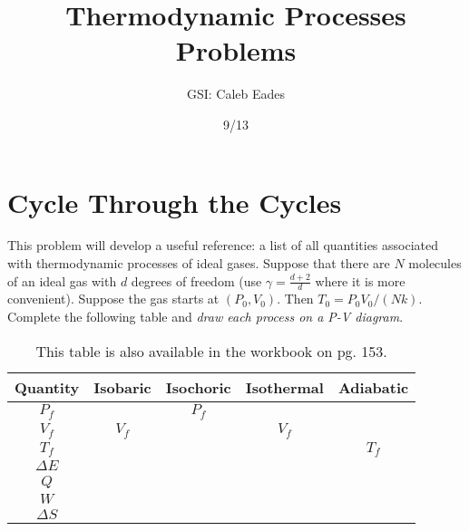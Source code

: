 \documentclass{article}
\begin{document}
\title{Thermodynamic Processes Problems}
\author{GSI: Caleb Eades}
\date{9/13}
\maketitle

\section{Cycle Through the Cycles}

This problem will develop a useful reference: a list of all quantities associated with thermodynamic processes of ideal gases. Suppose that there are $N$ molecules of an ideal gas with $d$ degrees of freedom (use $\gamma = \frac{d+2}{d}$ where it is more convenient). Suppose the gas starts at $(P_0,V_0)$. Then $T_0 = P_0V_0/(Nk)$. Complete the following table and \textit{draw each process on a P-V diagram}.

\def\arraystretch{2.5}
\begin{table}[h]
	\begin{center}
	\caption{This table is also available in the workbook on pg. 153.}
	
	\begin{tabular}{| >{\Large}c|c|c|c|c|}
		\hline
		\normalsize{\textbf{Quantity}} & \textbf{Isobaric} & \textbf{Isochoric} & \textbf{Isothermal} & \textbf{Adiabatic} \\ \hline
		$P_f$             &                   & $P_f$                  &                     &                    \\ \hline
		$V_f$             & $V_f$             &                        & $V_f$               &                    \\ \hline
		$T_f$             &                   &                        &                     & $T_f$              \\ \hline
		$\Delta E$        &                   &                        &                     &                    \\ \hline
		$Q$               &                   &                        &                     &                    \\ \hline
		$W$               &                   &                        &                     &                    \\ \hline
		$\Delta S$        &                   &                        &                     &                    \\ \hline
	\end{tabular}
	\end{center}
\end{table}
\end{document}
